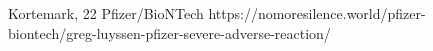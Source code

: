           {
            Kortemark, 
          }
          {
            22
          }
          {
            Pfizer/BioNTech
          }
          {
          }
          {
          }
          {
            https://nomoresilence.world/pfizer-biontech/greg-luyssen-pfizer-severe-adverse-reaction/
          }

